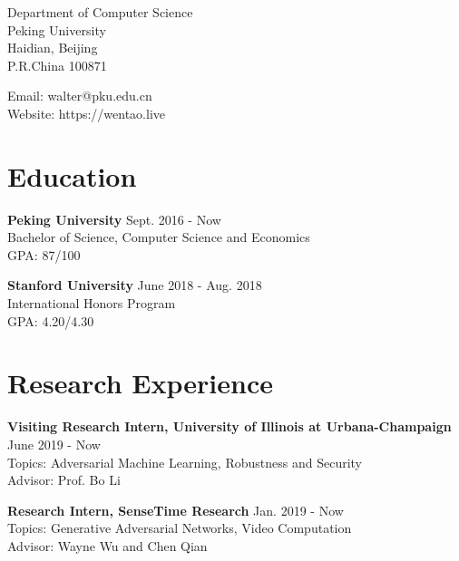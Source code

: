 \documentclass{academiccv}
\begin{document}
\raggedright


\vspace{1em}
\begin{minipage}[t]{0.495\textwidth}
  Department of Computer Science \\
 Peking University\\
  Haidian, Beijing\\
  P.R.China 100871
\end{minipage}
\begin{minipage}[t]{0.495\textwidth}
  Email: walter@pku.edu.cn \\
  Website: https://wentao.live \\
\end{minipage}
\vspace{0.5em}


\section*{Education}



\textbf{Peking University} \hfill Sept. 2016 - Now  \\
Bachelor of Science, Computer Science and Economics \\
GPA: 87/100 \newline

\textbf{Stanford University} \hfill June 2018 - Aug. 2018 \\
International Honors Program \\
GPA: 4.20/4.30 \\

\section*{Research Experience}

\textbf{Visiting Research Intern, University of Illinois at Urbana-Champaign} \hfill June 2019 - Now  \\
Topics: Adversarial Machine Learning, Robustness and Security \\
Advisor: Prof. Bo Li \newline

\textbf{Research Intern, SenseTime Research} \hfill Jan. 2019 - Now  \\
Topics: Generative Adversarial Networks, Video Computation \\
Advisor: Wayne Wu and Chen Qian \newline
\end{document}
